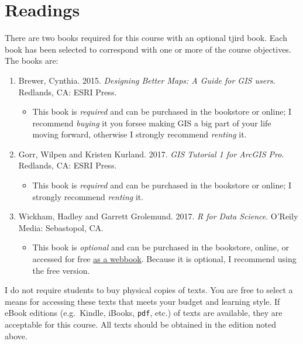 \documentclass[
]{book}
\providecommand{\tightlist}{%
  \setlength{\itemsep}{0pt}\setlength{\parskip}{0pt}}
\begin{document}
\hypertarget{readings}{%
\section{Readings}\label{readings}}

There are two books required for this course with an optional tjird book. Each book has been selected to correspond with one or more of the course objectives. The books are:

\begin{enumerate}
\def\labelenumi{\arabic{enumi}.}
\tightlist
\item
  Brewer, Cynthia. 2015. \emph{Designing Better Maps: A Guide for GIS users}. Redlands, CA: ESRI Press.

  \begin{itemize}
  \tightlist
  \item
    This book is \emph{required} and can be purchased in the bookstore or online; I recommend \emph{buying} it you forsee making GIS a big part of your life moving forward, otherwise I strongly recommend \emph{renting} it.
  \end{itemize}
\item
  Gorr, Wilpen and Kristen Kurland. 2017. \emph{GIS Tutorial 1 for ArcGIS Pro}. Redlands, CA: ESRI Press.

  \begin{itemize}
  \tightlist
  \item
    This book is \emph{required} and can be purchased in the bookstore or online; I strongly recommend \emph{renting} it.
  \end{itemize}
\item
  Wickham, Hadley and Garrett Grolemund. 2017. \emph{R for Data Science}. O'Reily Media: Sebastopol, CA.

  \begin{itemize}
  \tightlist
  \item
    This book is \emph{optional} and can be purchased in the bookstore, online, or accessed for free \href{http://r4ds.had.co.nz}{as a webbook}. Because it is optional, I recommend using the free version.
  \end{itemize}
\end{enumerate}

I do not require students to buy physical copies of texts. You are free to select a means for accessing these texts that meets your budget and learning style. If eBook editions (e.g.~Kindle, iBooks, \texttt{pdf}, etc.) of texts are available, they are acceptable for this course. All texts should be obtained in the edition noted above.
\end{document}
